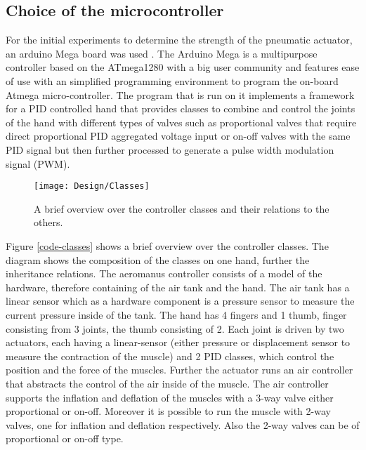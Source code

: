 \documentclass[main]{subfiles}
\begin{document}
\begin{comment}A big problem that has to be tackled is the big lack of sensory interface of all prosthetic devices up to date. Several amputees feel pain in the stump itself so that a signal can not be safely retrieved. Recent studies \cite{Kuiken2007,targeted-muscle-innervation} propose the reinnervation of nerves into the tissue of the chest of the amputee to make them feel on the chest's skin as well as motor-nerve reinnervation to create artificial residual muscles to extend the prosthesis control capabilities of the user.
\end{comment}


\subsection{Choice of the microcontroller}
For the initial experiments to determine the strength of the pneumatic actuator, an arduino Mega board was used \cite{Arduino}. The Arduino Mega is a multipurpose controller based on the ATmega1280 with a big user community and features ease of use with an simplified programming environment to program the on-board Atmega micro-controller. The program that is run on it implements a framework for a PID controlled hand that provides classes to combine and control the joints of the hand with different types of valves such as proportional valves that require direct proportional PID aggregated voltage input or on-off valves with the same PID signal but then further processed to generate a pulse width modulation signal (PWM).

\begin{figure}[htp]
\centering
\texttt{[image: Design/Classes]}
\caption[Controller classes]{A brief overview over the controller classes and their relations to the others.}
\label{code-classes.}
\end{figure}

Figure \ref{code-classes} shows a brief overview over the controller classes. The diagram shows the composition of the classes on one hand, further the inheritance relations. The aeromanus controller consists of a model of the hardware, therefore containing of the air tank and the hand. The air tank has a linear sensor which as a hardware component is a pressure sensor to measure the current pressure inside of the tank. The hand has 4 fingers and 1 thumb, finger consisting from 3 joints, the thumb consisting of 2. Each joint is driven by two actuators, each having a linear-sensor (either pressure or displacement sensor to measure the contraction of the muscle) and 2 PID classes, which control the position and the force of the muscles. Further the actuator runs an air controller that abstracts the control of the air inside of the muscle. The air controller supports the inflation and deflation of the muscles with a 3-way valve either proportional or on-off. Moreover it is possible to run the muscle with 2-way valves, one for inflation and deflation respectively. Also the 2-way valves can be of proportional or on-off type.
\end{document}
